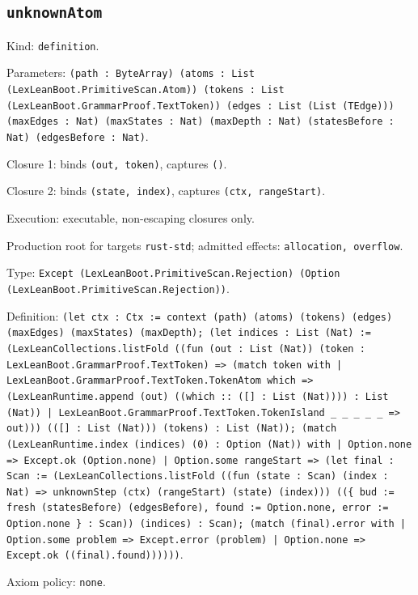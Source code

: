\documentclass[11pt]{article}
\begin{document}
\subsection*{\texttt{unknownAtom}}
\noindent Kind: \texttt{definition}.\par
\noindent Parameters: \texttt{(path : ByteArray) (atoms : List (LexLeanBoot.PrimitiveScan.Atom)) (tokens : List (LexLeanBoot.GrammarProof.TextToken)) (edges : List (List (TEdge))) (maxEdges : Nat) (maxStates : Nat) (maxDepth : Nat) (statesBefore : Nat) (edgesBefore : Nat)}.\par
\noindent Closure 1: binds \texttt{(out, token)}, captures \texttt{()}.\par
\noindent Closure 2: binds \texttt{(state, index)}, captures \texttt{(ctx, rangeStart)}.\par
\noindent Execution: executable, non-escaping closures only.\par
\noindent Production root for targets \texttt{rust-std}; admitted effects: \texttt{allocation, overflow}.\par
\noindent Type: \texttt{Except (LexLeanBoot.PrimitiveScan.Rejection) (Option (LexLeanBoot.PrimitiveScan.Rejection))}.\par
\noindent Definition: \texttt{(let ctx : Ctx := context (path) (atoms) (tokens) (edges) (maxEdges) (maxStates) (maxDepth); (let indices : List (Nat) := (LexLeanCollections.listFold ((fun (out : List (Nat)) (token : LexLeanBoot.GrammarProof.TextToken) => (match token with | LexLeanBoot.GrammarProof.TextToken.TokenAtom which => (LexLeanRuntime.append (out) ((which :: ([] : List (Nat)))) : List (Nat)) | LexLeanBoot.GrammarProof.TextToken.TokenIsland \_ \_ \_ \_ \_ => out))) (([] : List (Nat))) (tokens) : List (Nat)); (match (LexLeanRuntime.index (indices) (0) : Option (Nat)) with | Option.none => Except.ok (Option.none) | Option.some rangeStart => (let final : Scan := (LexLeanCollections.listFold ((fun (state : Scan) (index : Nat) => unknownStep (ctx) (rangeStart) (state) (index))) ((\{ bud := fresh (statesBefore) (edgesBefore), found := Option.none, error := Option.none \} : Scan)) (indices) : Scan); (match (final).error with | Option.some problem => Except.error (problem) | Option.none => Except.ok ((final).found))))))}.\par
\noindent Axiom policy: \texttt{none}.\par
\end{document}
